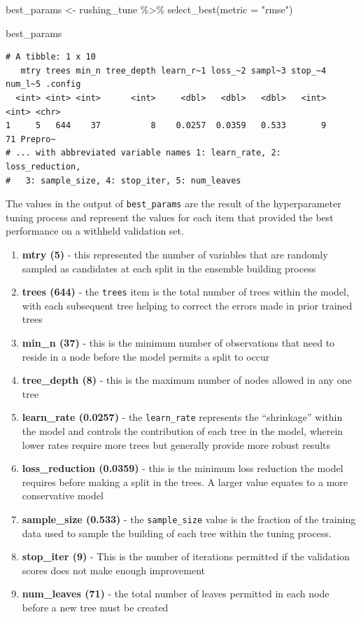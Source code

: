 \documentclass[
  letterpaper,
]{krantz}
\newenvironment{Shaded}{\begin{snugshade}}{\end{snugshade}}
\newcommand{\AttributeTok}[1]{\textcolor[rgb]{0.40,0.45,0.13}{#1}}
\newcommand{\FunctionTok}[1]{\textcolor[rgb]{0.28,0.35,0.67}{#1}}
\newcommand{\NormalTok}[1]{\textcolor[rgb]{0.00,0.23,0.31}{#1}}
\newcommand{\OtherTok}[1]{\textcolor[rgb]{0.00,0.23,0.31}{#1}}
\newcommand{\SpecialCharTok}[1]{\textcolor[rgb]{0.37,0.37,0.37}{#1}}
\newcommand{\StringTok}[1]{\textcolor[rgb]{0.13,0.47,0.30}{#1}}
\providecommand{\tightlist}{%
  \setlength{\itemsep}{0pt}\setlength{\parskip}{0pt}}\usepackage{longtable,booktabs,array}
\begin{document}
\begin{Shaded}
\begin{Highlighting}[]
\NormalTok{best\_params }\OtherTok{\textless{}{-}}\NormalTok{ rushing\_tune }\SpecialCharTok{\%\textgreater{}\%}
  \FunctionTok{select\_best}\NormalTok{(}\AttributeTok{metric =} \StringTok{"rmse"}\NormalTok{)}

\NormalTok{best\_params}
\end{Highlighting}
\end{Shaded}

\begin{verbatim}
# A tibble: 1 x 10
   mtry trees min_n tree_depth learn_r~1 loss_~2 sampl~3 stop_~4 num_l~5 .config
  <int> <int> <int>      <int>     <dbl>   <dbl>   <dbl>   <int>   <int> <chr>  
1     5   644    37          8    0.0257  0.0359   0.533       9      71 Prepro~
# ... with abbreviated variable names 1: learn_rate, 2: loss_reduction,
#   3: sample_size, 4: stop_iter, 5: num_leaves
\end{verbatim}

The values in the output of \texttt{best\_params} are the result of the
hyperparameter tuning process and represent the values for each item
that provided the best performance on a withheld validation set.

\begin{enumerate}
\def\labelenumi{\arabic{enumi}.}
\tightlist
\item
  \textbf{mtry (5)} - this represented the number of variables that are
  randomly sampled as candidates at each split in the ensemble building
  process
\item
  \textbf{trees (644)} - the \texttt{trees} item is the total number of
  trees within the model, with each subsequent tree helping to correct
  the errors made in prior trained trees
\item
  \textbf{min\_n (37)} - this is the minimum number of observations that
  need to reside in a node before the model permits a split to occur
\item
  \textbf{tree\_depth (8)} - this is the maximum number of nodes allowed
  in any one tree
\item
  \textbf{learn\_rate (0.0257)} - the \texttt{learn\_rate} represents
  the ``shrinkage'' within the model and controls the contribution of
  each tree in the model, wherein lower rates require more trees but
  generally provide more robust results
\item
  \textbf{loss\_reduction (0.0359)} - this is the minimum loss reduction
  the model requires before making a split in the trees. A larger value
  equates to a more conservative model
\item
  \textbf{sample\_size (0.533)} - the \texttt{sample\_size} value is the
  fraction of the training data used to sample the building of each tree
  within the tuning process.
\item
  \textbf{stop\_iter (9)} - This is the number of iterations permitted
  if the validation scores does not make enough improvement
\item
  \textbf{num\_leaves (71)} - the total number of leaves permitted in
  each node before a new tree must be created
\end{enumerate}
\end{document}
